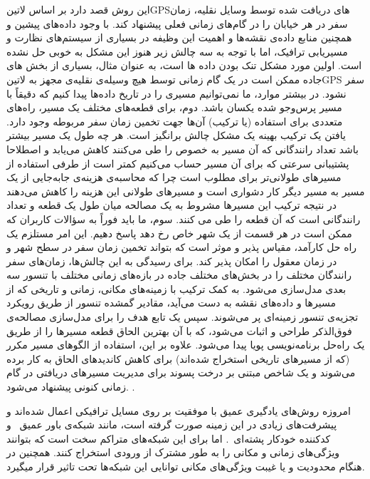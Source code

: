 این روش قصد دارد بر اساس ‌لاتین{GPS}های دریافت شده توسط وسایل نقلیه، زمان سفر در هر خیابان را در گام‌های زمانی فعلی پیشنهاد کند.
با وجود داده‌های پیشین و همچنین منابع داده‌ی نقشه‌ها و اهمیت این وظیفه در بسیاری از سیستم‌های نظارت
و مسیریابی ترافیک، اما با توجه به سه چالش زیر هنوز این مشکل به خوبی حل نشده است.
اولین مورد مشکل تنک بودن داده ها است، به عنوان مثال، بسیاری از بخش های جاده ممکن است
در یک گام زمانی توسط هیچ وسیله‌ی نقلیه‌ی مجهز به ‌لاتین{GPS} سفر نشود.
در بیشتر موارد، ما نمی‌توانیم مسیری را در تاریخ داده‌ها پیدا کنیم که دقیقاً با مسیر پرس‌و‌جو شده یکسان باشد.
دوم، برای قطعه‌های مختلف یک مسیر، راه‌های متعددی برای استفاده (یا ترکیب) آن‌ها جهت تخمین زمان سفر مربوطه وجود دارد.
یافتن یک ترکیب بهینه یک مشکل چالش برانگیز است. هر چه طول یک مسیر بیشتر باشد تعداد رانندگانی که آن مسیر به خصوص را طی می‌کنند کاهش می‌یابد و اصطلاحا پشتیبانی سرعتی که برای آن مسیر حساب می‌کنیم کمتر است از طرفی استفاده از مسیر‌های طولانی‌تر برای مطلوب است چرا که محاسبه‌ی هزینه‌ی جابه‌جایی از یک مسیر به مسیر دیگر کار دشواری است و مسیر‌های طولانی این هزینه را کاهش می‌دهند در نتیجه ترکیب این مسیر‌ها مشروط به یک مصالحه میان طول یک قطعه و تعداد رانندگانی است که آن قطعه را طی می کنند.
سوم، ما باید فوراً به سؤالات کاربران که ممکن است در هر قسمت از یک شهر خاص رخ دهد پاسخ دهیم.
این امر مستلزم یک راه حل کارآمد، مقیاس پذیر و موثر است که بتواند تخمین زمان سفر در سطح شهر و در زمان معقول را امکان پذیر کند.
برای رسیدگی به این چالش‌ها، زمان‌های سفر رانندگان مختلف را در بخش‌های مختلف جاده در بازه‌های زمانی مختلف با تنسور سه بعدی مدل‌سازی می‌شود.
به کمک ترکیب با زمینه‌های مکانی، زمانی و تاریخی که از مسیرها و داده‌های نقشه به دست می‌آید،
مقادیر گمشده تنسور از طریق رویکرد تجزیه‌ی تنسور زمینه‌ای پر می‌شوند.
سپس یک تابع هدف را برای مدل‌سازی مصالحه‌ی فوق‌الذکر طراحی و اثبات می‌شود،
که با آن بهترین الحاق قطعه مسیرها را از طریق یک راه‌حل برنامه‌نویسی پویا پیدا می‌شود.
علاوه بر این، استفاده از الگوهای مسیر مکرر (که از مسیرهای تاریخی استخراج شده‌اند)
برای کاهش کاندیدهای الحاق به کار برده می‌شوند و یک شاخص مبتنی بر درخت پسوند
برای مدیریت مسیرهای دریافتی در گام زمانی کنونی پیشنهاد می‌شود.
.

امروزه روش‌های یادگیری عمیق با موفقیت بر روی مسايل ترافیکی اعمال شده‌اند و پیشرفت‌های زیادی در این زمینه صورت گرفته است، مانند شبکه‌ی باور عمیق~ و کدکننده خودکار پشته‌ای~.
اما برای این شبکه‌های متراکم سخت است که بتوانند ویژگی‌های زمانی و مکانی را به طور مشترک از ورودی استخراج کنند.
همچنین در هنگام محدودیت و یا غیبت ویژگی‌های مکانی توانایی این شبکه‌ها تحت تاثیر قرار میگیرد.

